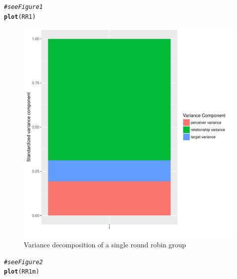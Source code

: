 \documentclass[a4paper]{article}\usepackage[]{graphicx}\usepackage[]{color}
\makeatletter
\def\maxwidth{ %
  \ifdim\Gin@nat@width>\linewidth
    \linewidth
  \else
    \Gin@nat@width
  \fi
}
\newcommand{\hlcom}[1]{\textcolor[rgb]{0.678,0.584,0.686}{\textit{#1}}}%
\newcommand{\hlstd}[1]{\textcolor[rgb]{0.345,0.345,0.345}{#1}}%
\newcommand{\hlkwd}[1]{\textcolor[rgb]{0.737,0.353,0.396}{\textbf{#1}}}%
\newenvironment{kframe}{%
 \def\at@end@of@kframe{}%
 \ifinner\ifhmode%
  \def\at@end@of@kframe{\end{minipage}}%
  \begin{minipage}{\columnwidth}%
 \fi\fi%
 \def\FrameCommand##1{\hskip\@totalleftmargin \hskip-\fboxsep
 \colorbox{shadecolor}{##1}\hskip-\fboxsep
     \hskip-\linewidth \hskip-\@totalleftmargin \hskip\columnwidth}%
 \MakeFramed {\advance\hsize-\width
   \@totalleftmargin\z@ \linewidth\hsize
   \@setminipage}}%
 {\par\unskip\endMakeFramed%
 \at@end@of@kframe}
\newenvironment{knitrout}{}{} %
\makeatother
\begin{document}
\begin{knitrout}\small
{}\color{fgcolor}\begin{kframe}
\begin{alltt}
\hlcom{# see Figure 1}
\hlkwd{plot}\hlstd{(RR1)}
\end{alltt}
\end{kframe}
\end{knitrout}

\begin{figure} 
\begin{center} 
\begin{knitrout}\small
{}\color{fgcolor}
\includegraphics[width=\maxwidth]{Sweave-Files/Sw_unnamed-chunk-21-1} 

\end{knitrout}
\end{center}
\caption{Variance decomposition of a single round robin group}
\label{fig:one}
\end{figure}




\begin{knitrout}\small
{}\color{fgcolor}\begin{kframe}
\begin{alltt}
\hlcom{# see Figure 2}
\hlkwd{plot}\hlstd{(RR1m)}
\end{alltt}
\end{kframe}
\end{knitrout}
\end{document}
